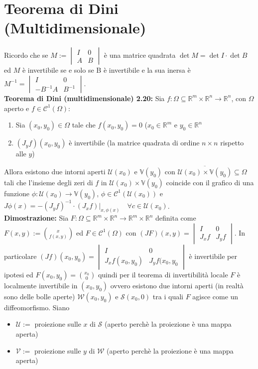 \documentclass[a4paper,11pt,titlepage]{book}
\begin{document}
\section{Teorema di Dini (Multidimensionale)}

Ricordo che se $M:=\begin{vmatrix} I & 0 \\ A & B \end{vmatrix}$ è una matrice quadrata $\det M=\det I\cdot \det B$ ed $M$ è invertibile se e solo se B è invertibile e la sua inersa è $M^{-1}=\begin{vmatrix} I & 0 \\ -B^{-1}A & B^{-1} \end{vmatrix}$.\\

\textbf{Teorema di Dini (multidimensionale) 2.20:} Sia $f:\Omega\subseteq\mathbb{R}^m\times\mathbb{R}^n\to\mathbb{R}^n$, con $\Omega$ aperto e $f\in\mathcal{C}^1(\Omega)$:
\begin{enumerate}
\item Sia $(x_0,y_0)\in\Omega$ tale che $f(x_0,y_0)=0$ ($x_0\in\mathbb{R}^m$ e $y_0\in\mathbb{R}^n$
\item $(J_yf)(x_0,y_0)$ è invertibile (la matrice quadrata di ordine $n\times n$ rispetto alle $y$)
\end{enumerate}

Allora esistono due intorni aperti $\mathcal{U}(x_0)$ e $\mathbb{V}(y_0)$ con $\overline{\mathcal{U}(x_0)\times\mathbb{V}(y_0)}\subseteq\Omega$ tali che l'insieme degli zeri di $f$ in $\mathcal{U}(x_0)\times\mathbb{V}(y_0)$ coincide con il grafico di una funzione $\phi:\mathcal{U}(x_0)\to\mathbb{V}(y_0)$, $\phi\in\mathcal{C}^1(\mathcal{U}(x_0))$ e $J\phi(x)=-(J_yf)^{-1}\cdot(J_xf)|_{x,\phi(x)}\quad\forall c\in\mathcal{U}(x_0)$.\\

\textbf{Dimostrazione:} Sia $F:\Omega\subseteq\mathbb{R}^m\times\mathbb{R}^n\to\mathbb{R}^m\times\mathbb{R}^n$ definita come $F(x,y):=\binom{x}{f(x,y)}$ ed $F\in\mathcal{C}^1(\Omega)$ con $(JF)(x,y)=\begin{vmatrix} I & 0 \\ J_xf & J_yf \end{vmatrix}$. In particolare $(Jf)(x_0,y_0)=\begin{vmatrix} I & 0 \\ J_xf(x_0,y_0) & J_yf(x_0,y_0 \end{vmatrix}$ è invertibile per ipotesi ed $F(x_0,y_0)=\binom{x_0}{0}$ quindi per il teorema di invertibilità locale $F$ è localmente invertibile in $(x_0,y_0)$ ovvero esistono due intorni aperti (in realtà sono delle bolle aperte) $\mathcal{W}(x_0,y_0)$ e $\mathcal{S}(x_0,0)$ tra i quali $F$ agisce come un diffeomorfismo. Siano\begin{itemize}
\item $\mathcal{U}:=$ proiezione sulle $x$ di $\mathcal{S}$ (aperto perchè la proiezione è una mappa aperta)
\item$\mathcal{V}:=$ proiezione sulle $y$ di $\mathcal{W}$ (aperto perchè la proiezione è una mappa aperta)\\
\end{itemize}
\end{document}
